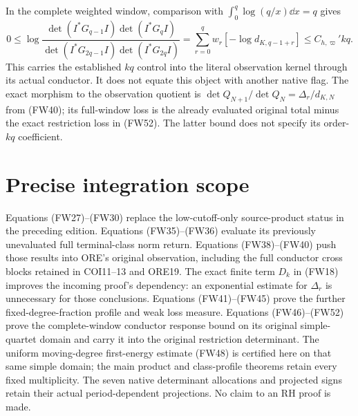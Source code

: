 \documentclass[11pt]{article}
\begin{document}
In the complete weighted window, comparison with
$\int_0^q\log(q/x)\dd x=q$ gives
\begin{equation}\tag{FW52}
 \boxed{0\le
 \log\frac{\det(I^*G_{q-1}I)\det(I^*G_qI)}
               {\det(I^*G_{2q-1}I)\det(I^*G_{2q}I)}
 =\sum_{r=0}^q w_r[-\log d_{K,q-1+r}]
 \le C_{h,\varpi}'kq.}
\end{equation}
This carries the established $kq$ control into the literal observation
kernel through its actual conductor. It does not equate this object with
another native flag. The exact morphism to the observation quotient is
$\det Q_{N+1}/\det Q_N=\Delta_r/d_{K,N}$ from (FW40); its full-window
loss is the already evaluated original total minus the exact restriction
loss in (FW52). The latter bound does not specify its order-$kq$ coefficient.

\section{Precise integration scope}
Equations (FW27)--(FW30) replace the low-cutoff-only source-product status
in the preceding edition. Equations (FW35)--(FW36) evaluate its previously
unevaluated full terminal-class norm return. Equations (FW38)--(FW40)
push those results into ORE's original observation, including the full
conductor cross blocks retained in COI11--13 and ORE19. The exact finite
term $D_k$ in (FW18) improves the incoming proof's dependency: an
exponential estimate for $\Delta_r$ is unnecessary for those conclusions.
Equations (FW41)--(FW45) prove the further fixed-degree-fraction profile
and weak loss measure. Equations (FW46)--(FW52) prove the complete-window
conductor response bound on its original simple-quartet domain and carry
it into the original restriction determinant. The uniform moving-degree
first-energy estimate (FW48) is certified here on that same simple domain;
the main product and class-profile theorems retain every fixed multiplicity.
The seven
native determinant allocations and projected signs retain their actual
period-dependent projections. No claim to an RH proof is made.
\end{document}
